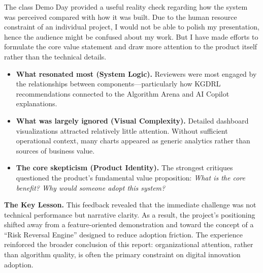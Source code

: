 The class Demo Day provided a useful reality check regarding how the system was perceived compared with how it was built. Due to the human resource constraint of an individual project, I would not be able to polish my presentation, hence the audience might be confused about my work. But I have made efforts to formulate the core value statement and draw more attention to the product itself rather than the technical details.

\begin{itemize}

\item \textbf{What resonated most (System Logic).} Reviewers were most engaged by the relationships between components---particularly how KGDRL recommendations connected to the Algorithm Arena and AI Copilot explanations.

\item \textbf{What was largely ignored (Visual Complexity).} Detailed dashboard visualizations attracted relatively little attention. Without sufficient operational context, many charts appeared as generic analytics rather than sources of business value.

\item \textbf{The core skepticism (Product Identity).} The strongest critiques questioned the product's fundamental value proposition: \textit{What is the core benefit? Why would someone adopt this system?}

\end{itemize}

\textbf{The Key Lesson.} This feedback revealed that the immediate challenge was not technical performance but narrative clarity. As a result, the project's positioning shifted away from a feature-oriented demonstration and toward the concept of a ``Risk Reversal Engine'' designed to reduce adoption friction. The experience reinforced the broader conclusion of this report: organizational attention, rather than algorithm quality, is often the primary constraint on digital innovation adoption.

